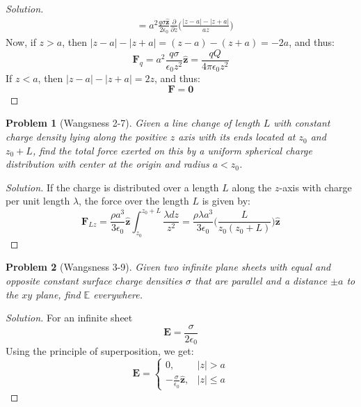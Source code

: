 \documentclass[oneside]{book}
\theoremstyle{mystyle}
\newtheorem{problem}{Problem}[section]
\begin{document}
\begin{proof}[Solution]
\begin{align*}
    &= a^{2}\frac{q\sigma \hat{\mathbf{z}}}{2\epsilon_{0}} \frac{\partial}{\partial z}\bigg(\frac{|z-a|-|z+a|}{az}\bigg)
\end{align*}
Now, if $z>a$, then $|z-a|-|z+a| = (z-a)-(z+a) = -2a$, and thus:
\begin{equation*}
    \mathbf{F}_{q} = a^{2}\frac{q\sigma}{\epsilon_{0}z^{2}}\hat{\mathbf{z}} = \frac{qQ}{4\pi \epsilon_{0}z^{2}} \tag{$z>a$}
\end{equation*}
If $z<a$, then $|z-a|-|z+a| = 2z$, and thus:
\begin{equation*}
    \mathbf{F} = \mathbf{0} \tag{$z<a$}
\end{equation*}
\end{proof}
\begin{problem}[Wangsness 2-7]
Given a line change of length $L$ with constant charge density lying along the positive $z$ axis with its ends located at $z_{0}$ and $z_{0}+L$, find the total force exerted on this by a uniform spherical charge distribution with center at the origin and radius $a<z_{0}$.
\end{problem}
\begin{proof}[Solution]
If the charge is distributed over a length $L$ along the $z$-axis with charge per unit length $\lambda$, the force over the length $L$ is given by:
\begin{equation*}
    \mathbf{F}_{Lz} = \frac{\rho a^3}{3\epsilon_0}\hat{\mathbf{z}} \int_{z_0}^{z_0+L} \frac{\lambda dz}{z^2} = \frac{\rho \lambda a^3}{3\epsilon_0}\bigg(\frac{L}{z_0(z_0+L)}\bigg) \hat{\mathbf{z}}
\end{equation*}
\end{proof}
\begin{problem}[Wangsness 3-9]
Given two infinite plane sheets with equal and opposite constant surface charge densities $\sigma$ that are parallel and a distance $\pm a$ to the $xy$ plane, find $\mathbb{E}$ everywhere.
\end{problem}
\begin{proof}[Solution]
For an infinite sheet
\begin{equation*}
    \mathbf{E} = \frac{\sigma}{2\epsilon_0}    
\end{equation*}
Using the principle of superposition, we get:
\begin{equation*}
    \mathbf{E} = \begin{cases} 0, & |z|>a \\ -\frac{\sigma}{\epsilon_0}\hat{\mathbf{z}},& |z|\leq a\end{cases}
\end{equation*}
\end{proof}
\end{document}

